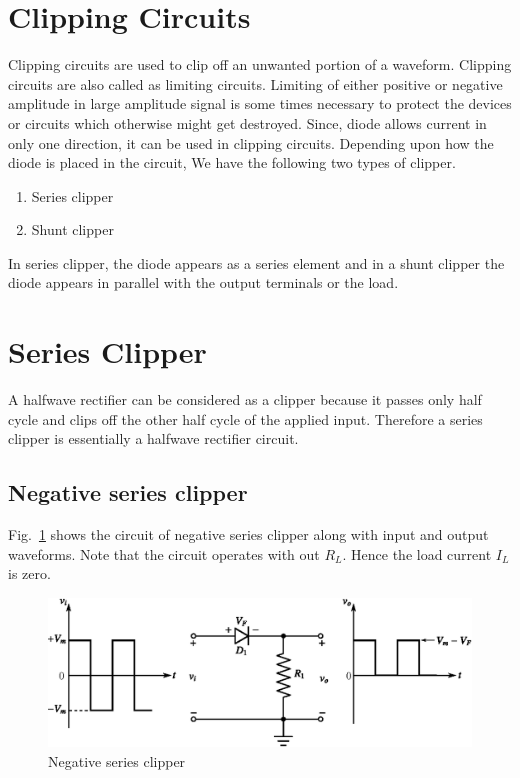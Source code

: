 \section{Clipping Circuits}\label{sec2.29}

Clipping circuits are used to clip off an unwanted portion of a waveform. Clipping circuits are also called as limiting circuits. Limiting of either positive or negative amplitude in large amplitude signal is some times necessary to protect the devices or circuits which otherwise might get destroyed. Since, diode allows current in only one direction, it can be used in clipping circuits. Depending upon how the diode is placed in the circuit, We have the following two types of clipper.
\begin{enumerate}
\item Series clipper

\item Shunt clipper
\end{enumerate}

In series clipper, the diode appears as a series element and in a shunt clipper the diode appears in parallel with the output terminals or the load.

\section{Series Clipper}\label{sec2.30}

A halfwave rectifier can be considered as a clipper because it passes only half cycle and clips off the other half cycle of the applied input. Therefore a series clipper is essentially a halfwave rectifier circuit.

\subsection{Negative series clipper}\label{sec2.30.1}

Fig.~\ref{fig2.25} shows the circuit of negative series clipper along with input and output waveforms. Note that the circuit operates with out $R_{L}$. Hence the load current $I_{L}$ is zero.
\begin{figure}[H]
\centering
\includegraphics{chap2/fig2.25.eps}
\caption{Negative series clipper}\label{fig2.25}
\end{figure}

